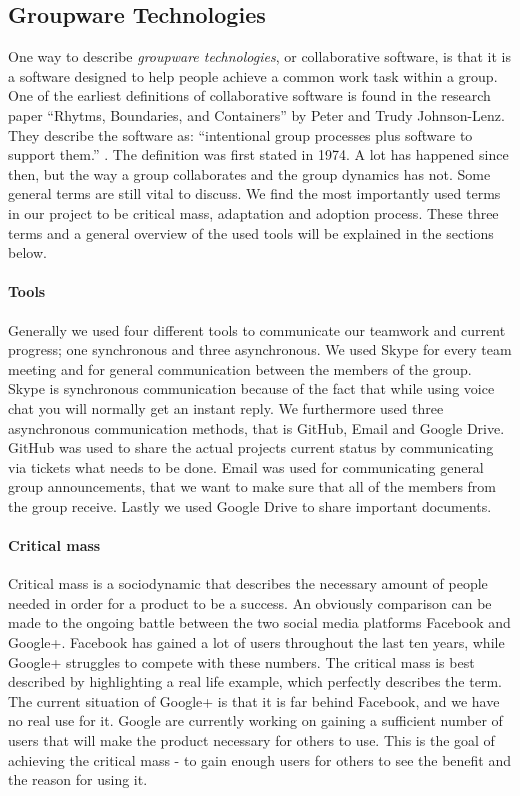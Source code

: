 \subsection{Groupware Technologies} \label{subsec:groupwaretechnologies}
One way to describe \textit{groupware technologies}, or collaborative software, is that it is a software designed to help people achieve a common work task within a group. One of the earliest definitions of collaborative software is found in the research paper ``Rhytms, Boundaries, and Containers'' by Peter and Trudy Johnson-Lenz. They describe the software as: ``intentional group processes plus software to support them.'' \cite{johnson1991post}. The definition was first stated in 1974. A lot has happened since then, but the way a group collaborates and the group dynamics has not. Some general terms are still vital to discuss. We find the most importantly used terms in our project to be critical mass, adaptation and adoption process. These three terms and a general overview of the used tools will be explained in the sections below.

\paragraph{Tools} \label{par:tools}
Generally we used four different tools to communicate our teamwork and current progress; one synchronous and three asynchronous. We used Skype for every team meeting and for general communication between the members of the group. Skype is synchronous communication because of the fact that while using voice chat you will normally get an instant reply. We furthermore used three asynchronous communication methods, that is GitHub, Email and Google Drive. GitHub was used to share the actual projects current status by communicating via tickets what needs to be done. Email was used for communicating general group announcements, that we want to make sure that all of the members from the group receive. Lastly we used Google Drive to share important documents.  

\paragraph{Critical mass} \label{par:criticalmass}
Critical mass \cite{grudin1994groupware} is a sociodynamic that describes the necessary amount of people needed in order for a product to be a success. An obviously comparison can be made to the ongoing battle between the two social media platforms Facebook and Google+. Facebook has gained a lot of users throughout the last ten years, while Google+ struggles to compete with these numbers. The critical mass is best described by highlighting a real life example, which perfectly describes the term. The current situation of Google+ is that it is far behind Facebook, and we have no real use for it. Google are currently working on gaining a sufficient number of users that will make the product necessary for others to use. This is the goal of achieving the critical mass - to gain enough users for others to see the benefit and the reason for using it. 

